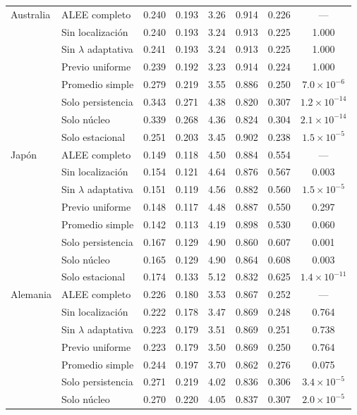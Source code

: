 \begin{longtable}{llcccccc}
\midrule
Australia & ALEE completo & 0.240 & 0.193 & 3.26 & 0.914 & 0.226 & --- \\
 & Sin localización & 0.240 & 0.193 & 3.24 & 0.913 & 0.225 & 1.000 \\
 & Sin $\lambda$ adaptativa & 0.241 & 0.193 & 3.24 & 0.913 & 0.225 & 1.000 \\
 & Previo uniforme & 0.239 & 0.192 & 3.23 & 0.914 & 0.224 & 1.000 \\
 & Promedio simple & 0.279 & 0.219 & 3.55 & 0.886 & 0.250 & $7.0\times10^{-6}$ \\
 & Solo persistencia & 0.343 & 0.271 & 4.38 & 0.820 & 0.307 & $1.2\times10^{-14}$ \\
 & Solo núcleo & 0.339 & 0.268 & 4.36 & 0.824 & 0.304 & $2.1\times10^{-14}$ \\
 & Solo estacional & 0.251 & 0.203 & 3.45 & 0.902 & 0.238 & $1.5\times10^{-5}$ \\
\midrule
Japón & ALEE completo & 0.149 & 0.118 & 4.50 & 0.884 & 0.554 & --- \\
 & Sin localización & 0.154 & 0.121 & 4.64 & 0.876 & 0.567 & 0.003 \\
 & Sin $\lambda$ adaptativa & 0.151 & 0.119 & 4.56 & 0.882 & 0.560 & $1.5\times10^{-5}$ \\
 & Previo uniforme & 0.148 & 0.117 & 4.48 & 0.887 & 0.550 & 0.297 \\
 & Promedio simple & 0.142 & 0.113 & 4.19 & 0.898 & 0.530 & 0.060 \\
 & Solo persistencia & 0.167 & 0.129 & 4.90 & 0.860 & 0.607 & 0.001 \\
 & Solo núcleo & 0.165 & 0.129 & 4.90 & 0.864 & 0.608 & 0.003 \\
 & Solo estacional & 0.174 & 0.133 & 5.12 & 0.832 & 0.625 & $1.4\times10^{-11}$ \\
\midrule
Alemania & ALEE completo & 0.226 & 0.180 & 3.53 & 0.867 & 0.252 & --- \\
 & Sin localización & 0.222 & 0.178 & 3.47 & 0.869 & 0.248 & 0.764 \\
 & Sin $\lambda$ adaptativa & 0.223 & 0.179 & 3.51 & 0.869 & 0.251 & 0.738 \\
 & Previo uniforme & 0.223 & 0.179 & 3.50 & 0.869 & 0.250 & 0.764 \\
 & Promedio simple & 0.244 & 0.197 & 3.70 & 0.862 & 0.276 & 0.075 \\
 & Solo persistencia & 0.271 & 0.219 & 4.02 & 0.836 & 0.306 & $3.4\times10^{-5}$ \\
 & Solo núcleo & 0.270 & 0.220 & 4.05 & 0.837 & 0.307 & $2.0\times10^{-5}$ \\

\end{longtable}
